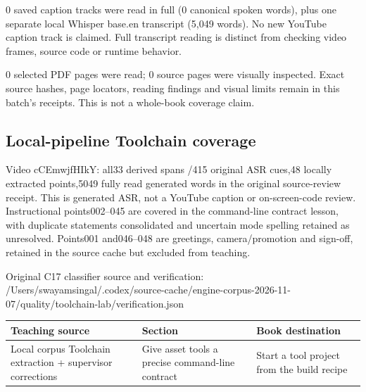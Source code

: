 0 saved caption tracks were read in full (0 canonical spoken words), plus one separate local Whisper base.en transcript (5,049 words). No new YouTube caption track is claimed. Full transcript reading is distinct from checking video frames, source code or runtime behavior.

0 selected PDF pages were read; 0 source pages were visually inspected. Exact source hashes, page locators, reading findings and visual limits remain in this batch's receipts. This is not a whole-book coverage claim.

\subsection{Local-pipeline Toolchain coverage}\label{appendix-877738f6f4d2-local-pipeline-toolchain-coverage}

\hypertarget{appendix-877738f6f4d2-local-pipeline-toolchain-coverage}{}

Video cCEmwjfHIkY: all33 derived spans /415 original ASR cues,48 locally extracted points,5049 fully read generated words in the original source-review receipt. This is generated ASR, not a YouTube caption or on-screen-code review. Instructional points002--045 are covered in the command-line contract lesson, with duplicate statements consolidated and uncertain mode spelling retained as unresolved. Points001 and046--048 are greetings, camera/promotion and sign-off, retained in the source cache but excluded from teaching.

Original C17 classifier source and verification: /Users/swayamsingal/.codex/source-cache/engine-corpus-2026-11-07/quality/toolchain-lab/verification.json

{\def\LTcaptype{none} %
\begin{longtable}[]{@{}
  >{\raggedright\arraybackslash}p{}
  >{\raggedright\arraybackslash}p{}
  >{\raggedright\arraybackslash}p{}@{}}
\toprule\noalign{}
\begin{minipage}[b]{\linewidth}\raggedright
Teaching source
\end{minipage} & \begin{minipage}[b]{\linewidth}\raggedright
Section
\end{minipage} & \begin{minipage}[b]{\linewidth}\raggedright
Book destination
\end{minipage} \\
\midrule\noalign{}
\endhead
\bottomrule\noalign{}
\endlastfoot
Local corpus Toolchain extraction + supervisor corrections & Give asset tools a precise command-line contract & Start a tool project from the build recipe \\
\end{longtable}
}

